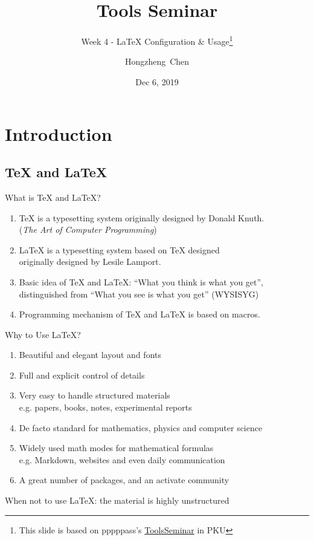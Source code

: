 \documentclass{../TexTemplate/myslide}
\title[ToolsSeminar]{Tools Seminar}
\subtitle{Week 4 - \LaTeX{} Configuration \& Usage\protect\footnote{This slide is based on pppppass's \href{https://github.com/pppppass/ToolsSeminar}{ToolsSeminar} in PKU}}
\author[chhzh123]{Hongzheng~Chen}
\date[Dec 6, 2019]{Dec 6, 2019}
\begin{document}
\begin{frame}
\titlepage
\end{frame}

\begin{frame}
\tableofcontents
\end{frame}

\section{Introduction}
\begin{frame}
\sectionpage
\end{frame}

\subsection{\TeX{} and \LaTeX}
\begin{frame}{What is \TeX{} and \LaTeX?}
\begin{enumerate}
\item \TeX{} is a typesetting system originally designed by Donald Knuth.\\
(\emph{The Art of Computer Programming})
\item \LaTeX{} is a typesetting system based on \TeX{} designed \\
originally designed by Lesile Lamport.
\item Basic idea of \TeX{} and \LaTeX{}: ``What you think is what you get'', \\ distinguished from ``What you see is what you get'' (WYSISYG)
\item Programming mechanism of \TeX{} and \LaTeX{} is based on macros.
\end{enumerate}
\end{frame}

\begin{frame}{Why to Use \LaTeX?}
\begin{enumerate}[<+->]
\item Beautiful and elegant layout and fonts
\item Full and explicit control of details
\item Very easy to handle structured materials \\
e.g. papers, books, notes, experimental reports
\item De facto standard for mathematics, physics and computer science
\item Widely used math modes for mathematical formulas \\
e.g. Markdown, websites and even daily communication
\item A great number of packages, and an activate community
\end{enumerate}
\pause
When not to use \LaTeX{}: the material is highly unstructured
\end{frame}
\end{document}

